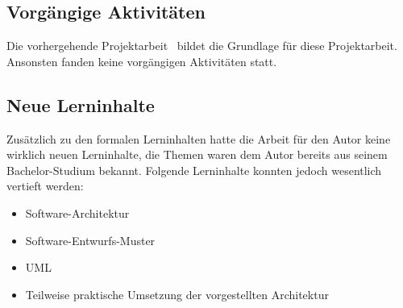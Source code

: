 \subsection{Vorgängige Aktivitäten}
\label{subsec:preliminaries}

Die vorhergehende Projektarbeit~\cite{osterwalder_sven_volume_2016} bildet die
Grundlage für diese Projektarbeit. Ansonsten fanden keine vorgängigen
Aktivitäten statt.

\subsection{Neue Lerninhalte}
\label{subsec:new_learning_contents}

Zusätzlich zu den formalen Lerninhalten hatte die Arbeit für den Autor
keine wirklich neuen Lerninhalte, die Themen waren dem Autor bereits aus seinem
Bachelor-Studium bekannt. Folgende Lerninhalte konnten jedoch wesentlich
vertieft werden:

\begin{itemize}
    \item{Software-Architektur}
    \item{Software-Entwurfs-Muster}
    \item{UML}
    \item{Teilweise praktische Umsetzung der vorgestellten Architektur}
\end{itemize}

